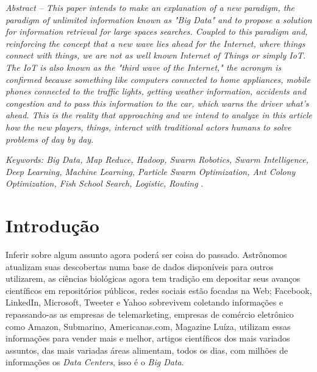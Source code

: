\documentclass[conference,compsoc]{IEEEtran}
\begin{document}
\vspace{0.1cm}

\textit{Abstract -- This paper intends to make an explanation of a new paradigm, the paradigm of unlimited information known as "Big Data" and to propose a solution for information retrieval for large spaces searches. Coupled to this paradigm and, reinforcing the concept that a new wave lies ahead for the Internet, where things connect with things, we are not as well known Internet of Things   or simply IoT. The IoT is also known as the "third wave of the Internet," the acronym is confirmed because something like computers connected to home appliances, mobile phones connected to the traffic lights, getting weather information, accidents and congestion and to pass this information to the car, which warns the driver what's ahead. This is the reality that approaching and we intend to analyze in this article how the new players, things, interact with traditional actors humans to solve problems of day by day.
}

\textit{Keywords: Big Data, Map Reduce, Hadoop, Swarm Robotics, Swarm Intelligence, Deep Learning, Machine Learning, Particle Swarm Optimization, Ant Colony Optimization, Fish School Search, Logistic, Routing
}.



%
\IEEEpeerreviewmaketitle



\section{Introdução}

Inferir sobre algum assunto agora poderá ser coisa do passado. Astrônomos atualizam suas descobertas numa base de 
dados disponíveis para outros utilizarem, as ciências biológicas agora tem tradição em depositar seus avanços 
científicos em repositórios públicos, redes sociais estão focadas na Web; Facebook, 
LinkedIn, Microsoft, Tweeter e Yahoo sobrevivem coletando informações e repassando-as as empresas de telemarketing, 
empresas de comércio eletrônico como Amazon, Submarino, Americanas.com, Magazine Luíza, utilizam essas informações 
para vender mais e melhor, artigos científicos dos mais variados assuntos, das mais variadas áreas alimentam, 
todos os dias,  com milhões de informações os \textit{Data Centers}, isso é o \textit{Big Data}.
\end{document}

